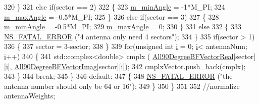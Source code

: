 \begin{DoxyCode}
320                         \}
321                         \textcolor{keywordflow}{else} \textcolor{keywordflow}{if}(sector == 2)
322                         \{
323                                 \hyperlink{classns3_1_1AntennaArrayModel_a07697f3127921e2f89bbd4250a9ef731}{m\_minAngle} = -1*M\_PI;
324                                 \hyperlink{classns3_1_1AntennaArrayModel_a26e13d2c83e29ce7d13d6dec94131589}{m\_maxAngle} = -0.5*M\_PI;
325                         \}
326                         \textcolor{keywordflow}{else} \textcolor{keywordflow}{if}(sector == 3)
327                         \{
328                                 \hyperlink{classns3_1_1AntennaArrayModel_a07697f3127921e2f89bbd4250a9ef731}{m\_minAngle} = -0.5*M\_PI;
329                                 \hyperlink{classns3_1_1AntennaArrayModel_a26e13d2c83e29ce7d13d6dec94131589}{m\_maxAngle} = 0;
330                         \}
331                         \textcolor{keywordflow}{else}
332                         \{
333                                 \hyperlink{group__fatal_ga5131d5e3f75d7d4cbfd706ac456fdc85}{NS\_FATAL\_ERROR} (\textcolor{stringliteral}{"4 antenna only need 4 sectors"});
334                         \}
335                         \textcolor{keywordflow}{if}(sector > 1)
336                         \{
337                                 sector = 3-sector;
338                         \}
339                         \textcolor{keywordflow}{for}(\textcolor{keywordtype}{unsigned} \textcolor{keywordtype}{int} \hyperlink{bernuolliDistribution_8m_a6f6ccfcf58b31cb6412107d9d5281426}{i} = 0; \hyperlink{bernuolliDistribution_8m_a6f6ccfcf58b31cb6412107d9d5281426}{i}< antennaNum; \hyperlink{bernuolliDistribution_8m_a6f6ccfcf58b31cb6412107d9d5281426}{i}++)
340                         \{
341                                 std::complex<double> cmplx (
      \hyperlink{namespacens3_a99a69b63fe01d09d4a12b3213ead5ea2}{All90DegreeBFVectorReal}[sector][\hyperlink{bernuolliDistribution_8m_a6f6ccfcf58b31cb6412107d9d5281426}{i}],
      \hyperlink{namespacens3_a16d514d34160138e78245b2f88a6dc15}{All90DegreeBFVectorImag}[sector][i]);
342                                 cmplxVector.push\_back(cmplx);
343                         \}
344                         \textcolor{keywordflow}{break};
345                 \}
346                 \textcolor{keywordflow}{default}:
347                 \{
348                         \hyperlink{group__fatal_ga5131d5e3f75d7d4cbfd706ac456fdc85}{NS\_FATAL\_ERROR} (\textcolor{stringliteral}{"the antenna number should only be 64 or 16"});
349                 \}
350         \}
351 
352         \textcolor{comment}{//normalize antennaWeights;}

\end{DoxyCode}
